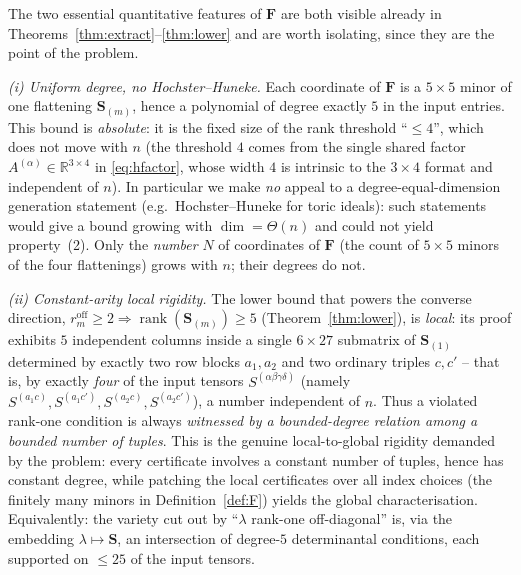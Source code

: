 \begin{remark}\label{rem:uniform}
The two essential quantitative features of $\mathbf F$ are both visible already in
Theorems~\ref{thm:extract}--\ref{thm:lower} and are worth isolating, since they are the
point of the problem.

\emph{(i) Uniform degree, no Hochster--Huneke.} Each coordinate of $\mathbf F$ is a
$5\times5$ minor of one flattening $\mathbf S_{(m)}$, hence a polynomial of degree exactly
$5$ in the input entries. This bound is \emph{absolute}: it is the fixed size of the rank
threshold ``$\le4$'', which does not move with $n$ (the threshold $4$ comes from the single
shared factor $A^{(\alpha)}\in\mathbb R^{3\times4}$ in \eqref{eq:hfactor}, whose width $4$ is
intrinsic to the $3\times4$ format and independent of $n$). In particular we make \emph{no}
appeal to a degree-equal-dimension generation statement (e.g.\ Hochster--Huneke for toric
ideals): such statements would give a bound growing with $\dim=\Theta(n)$ and could not
yield property~(2). Only the \emph{number} $N$ of coordinates of $\mathbf F$ (the count of
$5\times5$ minors of the four flattenings) grows with $n$; their degrees do not.

\emph{(ii) Constant-arity local rigidity.} The lower bound that powers the converse
direction, $r_m^{\mathrm{off}}\ge2\Rightarrow\operatorname{rank}(\mathbf S_{(m)})\ge5$
(Theorem~\ref{thm:lower}), is \emph{local}: its proof exhibits $5$ independent columns inside
a single $6\times27$ submatrix of $\mathbf S_{(1)}$ determined by exactly two row blocks
$a_1,a_2$ and two ordinary triples $c,c'$ -- that is, by exactly \emph{four} of the input
tensors $S^{(\alpha\beta\gamma\delta)}$ (namely $S^{(a_1c)},S^{(a_1c')},S^{(a_2c)},
S^{(a_2c')}$), a number independent of $n$. Thus a violated rank-one condition is always
\emph{witnessed by a bounded-degree relation among a bounded number of tuples}. This is the
genuine local-to-global rigidity demanded by the problem: every certificate involves a
constant number of tuples, hence has constant degree, while patching the local certificates
over all index choices (the finitely many minors in Definition~\ref{def:F}) yields the global
characterisation. Equivalently: the variety cut out by ``$\lambda$ rank-one off-diagonal''
is, via the embedding $\lambda\mapsto\mathbf S$, an intersection of degree-$5$ determinantal
conditions, each supported on $\le25$ of the input tensors.
\end{remark}

